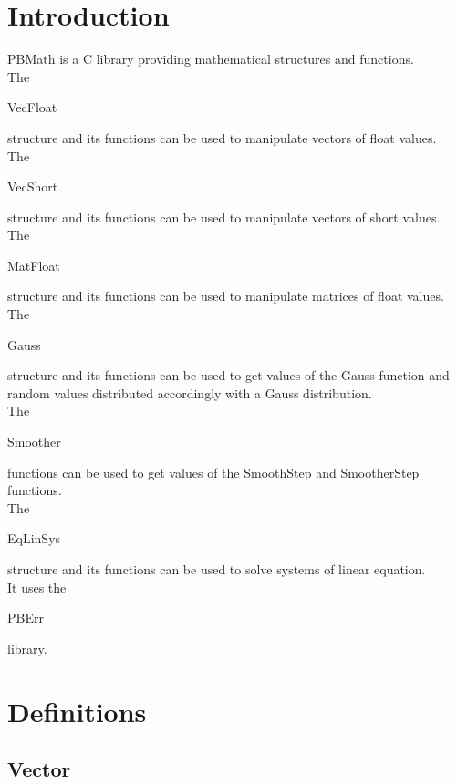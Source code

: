 \section*{Introduction}

PBMath is a C library providing mathematical structures and functions.\\ 

The \begin{ttfamily}VecFloat\end{ttfamily} structure and its functions can be used to manipulate vectors of float values.\\

The \begin{ttfamily}VecShort\end{ttfamily} structure and its functions can be used to manipulate vectors of short values.\\

The \begin{ttfamily}MatFloat\end{ttfamily} structure and its functions can be used to manipulate matrices of float values.\\

The \begin{ttfamily}Gauss\end{ttfamily} structure and its functions can be used to get values of the Gauss function and random values distributed accordingly with a Gauss distribution.\\

The \begin{ttfamily}Smoother\end{ttfamily} functions can be used to get values of the SmoothStep and SmootherStep functions.\\

The \begin{ttfamily}EqLinSys\end{ttfamily} structure and its functions can be used to solve systems of linear equation.\\

It uses the \begin{ttfamily}PBErr\end{ttfamily} library.\\

\section{Definitions}

\subsection{Vector}

